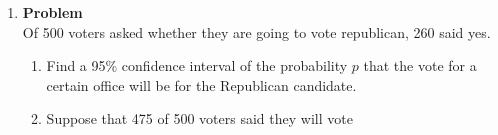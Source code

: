 \documentclass[12pt]{article}
\newenvironment{Ex}{\textbf{Problem}\vspace{.75em}\\}{}
\begin{document}
\begin{enumerate}
\begin{Ex}
\begin{solution}
\begin{enumerate}
\begin{mdframed}[backgroundcolor=silver]
\begin{description}
$$            (X-E[X])$$
            or alternatively
            $$\hat{\Theta} = E[\Theta]+
            \rho\frac{\sigma_{\Theta}}{\sigma_{X}}(X-E[X])$$
            where
            $$\rho =
            \frac{\text{Cov}(\Theta,X)}{\sigma_{\Theta}\sigma_{X}}$$
          \end{description}
        \end{mdframed}
        \begin{equation}
          \label{eq:3c-llms-estimator-sol}
          \begin{aligned}
            \hat{\Theta} &= E[\Theta]+
            \frac{\text{Cov}(\Theta,X)}{\text{Var}(X)} (X-E[X]) \\
            &= \frac{1}{2} + \frac{E[\Theta X] -
              E[\Theta]E[X]}{\frac{\theta^2}{12}}
            \left(X-\frac{\theta}{2}\right) \\
            &= \frac{1}{2} + \frac{E[\Theta X] -
              \frac{\theta}{4}}{\frac{\theta^2}{12}}
            \left(X-\frac{\theta}{2}\right) \\
            &= \frac{1}{2} + \frac{E[E[\Theta X|\Theta]] -
              \frac{\theta}{4}}{\frac{\theta^2}{12}}
            \left(X-\frac{\theta}{2}\right) \\
            &= \frac{1}{2} + \frac{E\left[\Theta
                \frac{1}{\theta}\right] -
              \frac{\theta}{4}}{\frac{\theta^2}{12}}
            \left(X-\frac{\theta}{2}\right) \\
            \implies \hat{\Theta} &= \frac{1}{2} + \frac{1 -
              \frac{\theta}{4}}{\frac{\theta^2}{12}}
            \left(X-\frac{\theta}{2}\right) \\
            \implies \hat{\Theta} &= \frac{2 \theta^2-3 \theta
              (X+2)+12 X}{\theta^2} \\
          \end{aligned}
        \end{equation}
      \end{enumerate}
    \end{solution}
  \end{Ex}
\item
  \begin{Ex}
    Of 500 voters asked whether they are going to vote republican, 260
    said yes.
    \begin{enumerate}
    \item Find a 95\% confidence interval of the probability $p$ that
      the vote for a certain office will be for the Republican
      candidate.
    \item Suppose that 475 of 500 voters said they will vote

\end{enumerate}
\end{Ex}
\end{enumerate}
\end{document}

